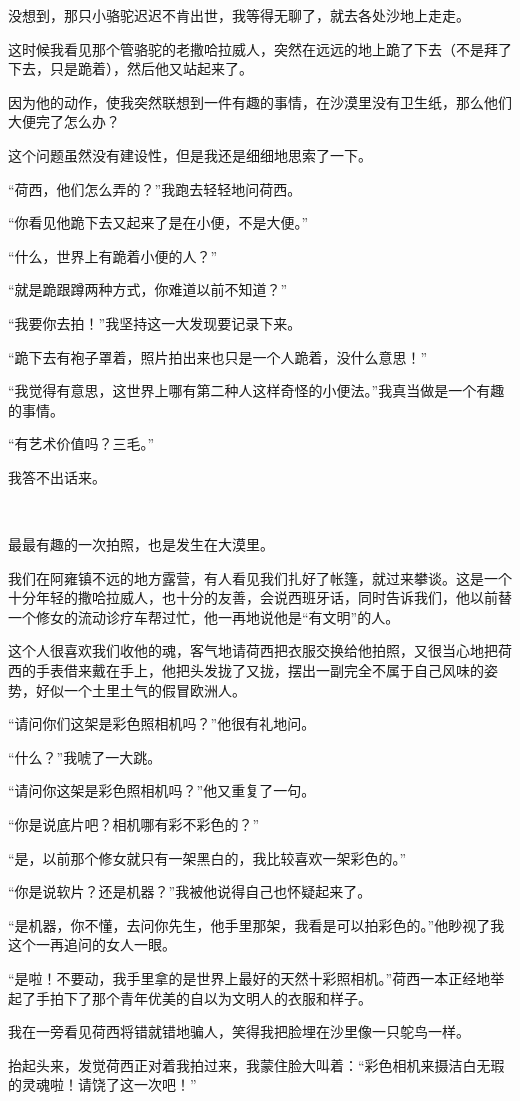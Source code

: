 \par 没想到，那只小骆驼迟迟不肯出世，我等得无聊了，就去各处沙地上走走。
\par 这时候我看见那个管骆驼的老撒哈拉威人，突然在远远的地上跪了下去（不是拜了下去，只是跪着），然后他又站起来了。
\par 因为他的动作，使我突然联想到一件有趣的事情，在沙漠里没有卫生纸，那么他们大便完了怎么办？
\par 这个问题虽然没有建设性，但是我还是细细地思索了一下。
\par “荷西，他们怎么弄的？”我跑去轻轻地问荷西。
\par “你看见他跪下去又起来了是在小便，不是大便。”
\par “什么，世界上有跪着小便的人？”
\par “就是跪跟蹲两种方式，你难道以前不知道？”
\par “我要你去拍！”我坚持这一大发现要记录下来。
\par “跪下去有袍子罩着，照片拍出来也只是一个人跪着，没什么意思！”
\par “我觉得有意思，这世界上哪有第二种人这样奇怪的小便法。”我真当做是一个有趣的事情。
\par “有艺术价值吗？三毛。”
\par 我答不出话来。
\par  
\par 最最有趣的一次拍照，也是发生在大漠里。
\par 我们在阿雍镇不远的地方露营，有人看见我们扎好了帐篷，就过来攀谈。这是一个十分年轻的撒哈拉威人，也十分的友善，会说西班牙话，同时告诉我们，他以前替一个修女的流动诊疗车帮过忙，他一再地说他是“有文明”的人。
\par 这个人很喜欢我们收他的魂，客气地请荷西把衣服交换给他拍照，又很当心地把荷西的手表借来戴在手上，他把头发拢了又拢，摆出一副完全不属于自己风味的姿势，好似一个土里土气的假冒欧洲人。
\par “请问你们这架是彩色照相机吗？”他很有礼地问。
\par “什么？”我唬了一大跳。
\par “请问你这架是彩色照相机吗？”他又重复了一句。
\par “你是说底片吧？相机哪有彩不彩色的？”
\par “是，以前那个修女就只有一架黑白的，我比较喜欢一架彩色的。”
\par “你是说软片？还是机器？”我被他说得自己也怀疑起来了。
\par “是机器，你不懂，去问你先生，他手里那架，我看是可以拍彩色的。”他眇视了我这个一再追问的女人一眼。
\par “是啦！不要动，我手里拿的是世界上最好的天然十彩照相机。”荷西一本正经地举起了手拍下了那个青年优美的自以为文明人的衣服和样子。
\par 我在一旁看见荷西将错就错地骗人，笑得我把脸埋在沙里像一只鸵鸟一样。
\par 抬起头来，发觉荷西正对着我拍过来，我蒙住脸大叫着：“彩色相机来摄洁白无瑕的灵魂啦！请饶了这一次吧！”

